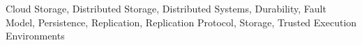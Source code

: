 \acresetall
\noindent
Cloud Storage,
Distributed Storage,
Distributed Systems,
Durability,
Fault Model,
Persistence,
Replication,
Replication Protocol,
Storage,
Trusted Execution Environments
